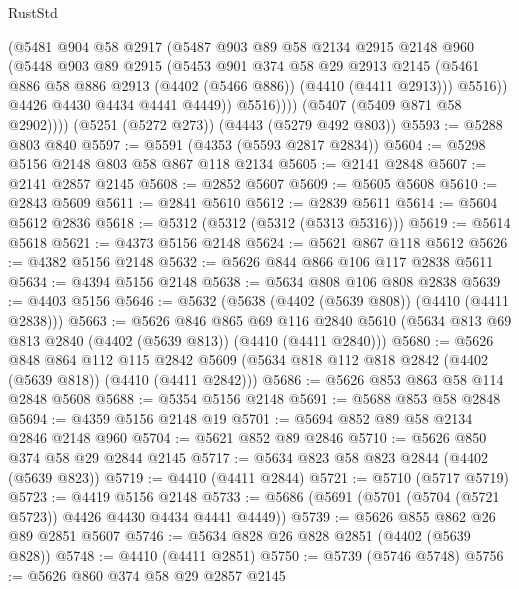 \begin{lexlean}{RustStd}
\begin{coremodule}
                (@5481
                  @904
                  @58
                  @2917
                  (@5487
                    @903
                    @89
                    @58
                    @2134
                    @2915
                    @2148
                    @960
                    (@5448
                      @903
                      @89
                      @2915
                      (@5453
                        @901
                        @374
                        @58
                        @29
                        @2913
                        @2145
                        (@5461 @886 @58 @886 @2913 (@4402 (@5466 @886)) (@4410 (@4411 @2913)))
                        @5516))
                    @4426
                    @4430
                    @4434
                    @4441
                    @4449))
                @5516))))
        (@5407 (@5409 @871 @58 @2902))))
    (@5251 (@5272 @273))
    (@4443 (@5279 @492 @803))
@5593 := @5288 @803 @840
@5597 := @5591 (@4353 (@5593 @2817 @2834))
@5604 := @5298 @5156 @2148 @803 @58 @867 @118 @2134
@5605 := @2141 @2848
@5607 := @2141 @2857 @2145
@5608 := @2852 @5607
@5609 := @5605 @5608
@5610 := @2843 @5609
@5611 := @2841 @5610
@5612 := @2839 @5611
@5614 := @5604 @5612 @2836
@5618 := @5312 (@5312 (@5312 (@5313 @5316)))
@5619 := @5614 @5618
@5621 := @4373 @5156 @2148
@5624 := @5621 @867 @118 @5612
@5626 := @4382 @5156 @2148
@5632 := @5626 @844 @866 @106 @117 @2838 @5611
@5634 := @4394 @5156 @2148
@5638 := @5634 @808 @106 @808 @2838
@5639 := @4403 @5156
@5646 := @5632 (@5638 (@4402 (@5639 @808)) (@4410 (@4411 @2838)))
@5663 := @5626
    @846
    @865
    @69
    @116
    @2840
    @5610
    (@5634 @813 @69 @813 @2840 (@4402 (@5639 @813)) (@4410 (@4411 @2840)))
@5680 := @5626
    @848
    @864
    @112
    @115
    @2842
    @5609
    (@5634 @818 @112 @818 @2842 (@4402 (@5639 @818)) (@4410 (@4411 @2842)))
@5686 := @5626 @853 @863 @58 @114 @2848 @5608
@5688 := @5354 @5156 @2148
@5691 := @5688 @853 @58 @2848
@5694 := @4359 @5156 @2148 @19
@5701 := @5694 @852 @89 @58 @2134 @2846 @2148 @960
@5704 := @5621 @852 @89 @2846
@5710 := @5626 @850 @374 @58 @29 @2844 @2145
@5717 := @5634 @823 @58 @823 @2844 (@4402 (@5639 @823))
@5719 := @4410 (@4411 @2844)
@5721 := @5710 (@5717 @5719)
@5723 := @4419 @5156 @2148
@5733 := @5686 (@5691 (@5701 (@5704 (@5721 @5723)) @4426 @4430 @4434 @4441 @4449))
@5739 := @5626 @855 @862 @26 @89 @2851 @5607
@5746 := @5634 @828 @26 @828 @2851 (@4402 (@5639 @828))
@5748 := @4410 (@4411 @2851)
@5750 := @5739 (@5746 @5748)
@5756 := @5626 @860 @374 @58 @29 @2857 @2145

\end{coremodule}
\end{lexlean}
